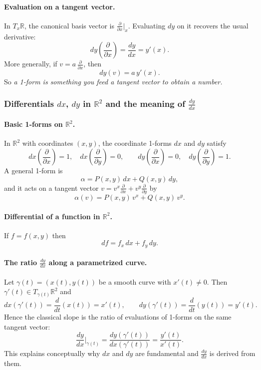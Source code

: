 \documentclass[12pt,a4paper]{article}
\theoremstyle{plain}
\theoremstyle{definition}      %
\begin{document}
\paragraph{Evaluation on a tangent vector.}
In $T_x\mathbb{R}$, the canonical basis vector is $\frac{\partial}{\partial x}\big|_x$.
Evaluating $dy$ on it recovers the usual derivative:
\[
dy\!\left(\frac{\partial}{\partial x}\right)=\frac{dy}{dx}=y'(x).
\]
More generally, if $v=a\,\frac{\partial}{\partial x}$, then
\[
dy(v)=a\,y'(x).
\]
So \emph{a 1-form is something you feed a tangent vector to obtain a number.}

\subsubsection*{Differentials $dx$, $dy$ in $\mathbb{R}^2$ and the meaning of $\frac{dy}{dx}$}

\paragraph{Basic 1-forms on $\mathbb{R}^2$.}
In $\mathbb{R}^2$ with coordinates $(x,y)$, the coordinate 1-forms $dx$ and $dy$ satisfy
\[
dx\!\left(\frac{\partial}{\partial x}\right)=1,\quad dx\!\left(\frac{\partial}{\partial y}\right)=0,
\qquad
dy\!\left(\frac{\partial}{\partial x}\right)=0,\quad dy\!\left(\frac{\partial}{\partial y}\right)=1.
\]
A general 1-form is
\[
\alpha = P(x,y)\,dx + Q(x,y)\,dy,
\]
and it acts on a tangent vector $v=v^x\frac{\partial}{\partial x}+v^y\frac{\partial}{\partial y}$ by
\[
\alpha(v)=P(x,y)\,v^x + Q(x,y)\,v^y.
\]

\paragraph{Differential of a function in $\mathbb{R}^2$.}
If $f=f(x,y)$ then
\[
df=f_x\,dx+f_y\,dy.
\]

\paragraph{The ratio $\frac{dy}{dx}$ along a parametrized curve.}
Let $\gamma(t)=(x(t),y(t))$ be a smooth curve with $x'(t)\neq 0$.
Then $\gamma'(t)\in T_{\gamma(t)}\mathbb{R}^2$ and
\[
dx(\gamma'(t))=\frac{d}{dt}(x(t))=x'(t),
\qquad
dy(\gamma'(t))=\frac{d}{dt}(y(t))=y'(t).
\]
Hence the classical slope is the ratio of evaluations of 1-forms on the same tangent vector:
\[
\frac{dy}{dx}\Big|_{\gamma(t)}=\frac{dy(\gamma'(t))}{dx(\gamma'(t))}=\frac{y'(t)}{x'(t)}.
\]
This explains conceptually why $dx$ and $dy$ are fundamental and $\frac{dy}{dx}$ is derived from them.
\end{document}
